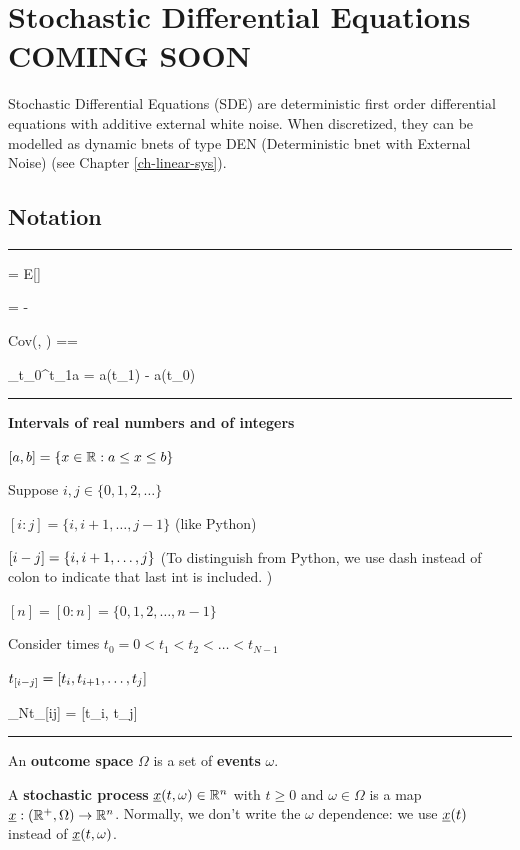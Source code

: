 \chapter{Stochastic Differential Equations COMING SOON}
\label{ch-stochastic-diff-eqns}


Stochastic Differential Equations (SDE)
are deterministic first order differential equations with additive external white noise. When discretized, they 
can be modelled as dynamic bnets of type
DEN (Deterministic bnet with External Noise) (see Chapter \ref{ch-linear-sys}).

\section{Notation}

\hrule{}

\beq 
\av{\rva} = E[\rva]
\eeq

\beq
\Delta \rva = \rva - \av{\rva}
\eeq

\beq
Cov(\rva, \rvb) =\av{\rva, \rvb}=
\av{\Delta\rva \Delta\rvb}
\eeq

\beq
\Delta_{t_0}^{t_1}a = a(t_1) - a(t_0)
\eeq

\hrule \noindent
{\bf Intervals of real numbers and of integers}

$[a, b]=\{ x\in { \mathbb{R}}: a\leq x \leq b\}$

Suppose $i, j\in \{0, 1,2, \ldots\}$

$[i:j] =\{i, i+1, \ldots, j-1\}$  (like Python)

$[i - j] = \{i, i+1, \ldots, j\}$ (To distinguish from Python,
we use dash instead of colon 
to indicate that last int is included.
)




$[n]=[0:n]=\{0, 1, 2, \ldots, n-1\}$


Consider times $t_0=0<t_1<t_2<\ldots < t_{N-1}$



$t_{[i- j]} = [t_i, t_{i+1}, \ldots, t_j]$


\beq
\lim_{N\rarrow \infty}t_{[i\upto j]} =
[t_i, t_j]
\eeq
\hrule{}

An {\bf outcome space} $\Omega$ 
is a set of {\bf events} $\omega$.

A {\bf stochastic process} ${\underline{x}}(t, \omega)\in{ \mathbb{R}}^n$ with $t\geq 0$ and $\omega\in\Omega$ is a map ${\underline{x}}:({ \mathbb{R}}^+,\Omega) \rightarrow { \mathbb{R}}^n$. Normally, we don't write the $\omega$ dependence: we use ${\underline{x}}(t)$ instead of ${\underline{x}}(t, \omega)$.


